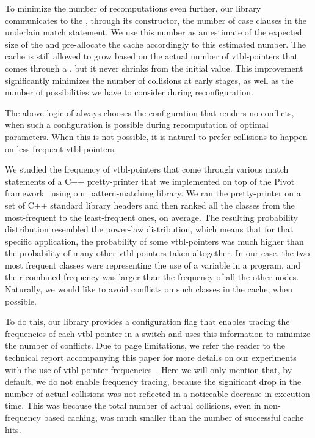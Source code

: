 To minimize the number of recomputations even further, our library communicates 
to the , through its constructor, the number of case clauses in 
the underlain match statement. We use this number as an estimate of the expected 
size of the  and pre-allocate the cache accordingly to this estimated 
number. The cache is still allowed to grow based on the actual number of 
vtbl-pointers that comes through a , but it never shrinks from the
initial value. This improvement significantly minimizes the number of collisions 
at early stages, as well as the number of possibilities we have to consider 
during reconfiguration.

The above logic of  always chooses the configuration that renders 
no conflicts, when such a configuration is possible during recomputation of 
optimal parameters. When this is not possible, it is natural to prefer collisions 
to happen on less-frequent vtbl-pointers.

We studied the frequency of vtbl-pointers that come through various match statements
of a C++ pretty-printer that we implemented on top of the Pivot 
framework~\cite{Pivot09} using our pattern-matching library. We ran the 
pretty-printer on a set of C++ standard library headers and then ranked all the  
classes from the most-frequent to the least-frequent ones, on average. The 
resulting probability distribution resembled the power-law distribution, which means 
that for that specific application, the probability of some vtbl-pointers was much 
higher than the probability of many other vtbl-pointers taken altogether. In 
our case, the two most frequent classes were representing the use of a variable in 
a program, and their combined frequency was larger than the frequency of all the 
other nodes. Naturally, we would like to avoid conflicts on such classes in the 
cache, when possible.

To do this, our library provides a configuration flag that enables tracing the
frequencies of each vtbl-pointer in a switch and uses this information to 
minimize the number of conflicts. Due to page limitations, we refer the reader 
to the technical report accompanying this paper for more details on our 
experiments with the use of vtbl-pointer frequencies~\cite{TR}. Here we will only 
mention that, by default, we do not enable frequency tracing, because the 
significant drop in the number of actual collisions was not reflected in a 
noticeable decrease in execution time. This was because the total 
number of actual collisions, even in non-frequency based caching, was much smaller 
than the number of successful cache hits.
